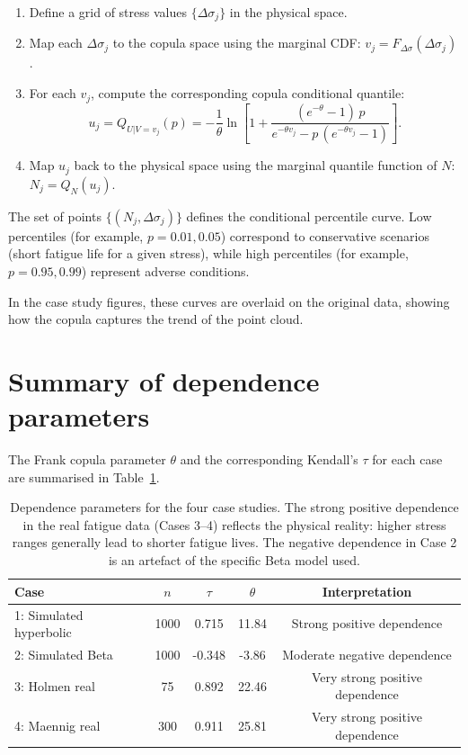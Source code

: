 \begin{enumerate}
    \item Define a grid of stress values \(\{\Delta\sigma_j\}\) in the physical space.
    \item Map each \(\Delta\sigma_j\) to the copula space using the marginal CDF: \(v_j = F_{\Delta\sigma}(\Delta\sigma_j)\).
    \item For each \(v_j\), compute the corresponding copula conditional quantile:
    \[
    u_j = Q_{U|V=v_j}(p) = -\frac{1}{\theta}\ln\left[1+\frac{(e^{-\theta}-1)\,p}{e^{-\theta v_j}-p\,(e^{-\theta v_j}-1)}\right].
    \]
    \item Map \(u_j\) back to the physical space using the marginal quantile function of \(N\): \(N_j = Q_N(u_j)\).
\end{enumerate}

The set of points \(\{(N_j,\Delta\sigma_j)\}\) defines the conditional percentile curve. Low percentiles (for example, \(p = 0.01, 0.05\)) correspond to conservative scenarios (short fatigue life for a given stress), while high percentiles (for example, \(p = 0.95, 0.99\)) represent adverse conditions.

In the case study figures, these curves are overlaid on the original data, showing how the copula captures the trend of the point cloud.

\section{Summary of dependence parameters}
\label{sec:dependence-parameters}

The Frank copula parameter \(\theta\) and the corresponding Kendall's \(\tau\) for each case are summarised in Table~\ref{tab:dependence}.

\begin{table}[htpb]
\centering
\begin{tabular}{@{}lcccc@{}}
\toprule
Case & \(n\) & \(\tau\) & \(\theta\) & Interpretation \\
\midrule
1: Simulated hyperbolic & 1000 & 0.715 & 11.84 & Strong positive dependence \\
2: Simulated Beta & 1000 & -0.348 & -3.86 & Moderate negative dependence \\
3: Holmen real & 75 & 0.892 & 22.46 & Very strong positive dependence \\
4: Maennig real & 300 & 0.911 & 25.81 & Very strong positive dependence \\
\bottomrule
\end{tabular}
\caption{Dependence parameters for the four case studies. The strong positive dependence in the real fatigue data (Cases 3–4) reflects the physical reality: higher stress ranges generally lead to shorter fatigue lives. The negative dependence in Case 2 is an artefact of the specific Beta model used.}
\label{tab:dependence}
\end{table}

